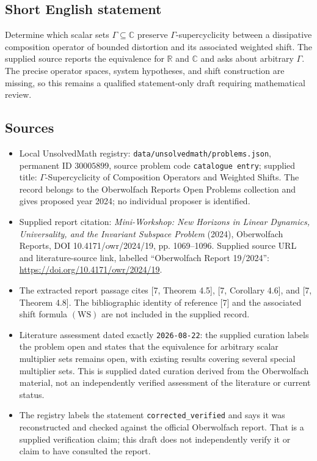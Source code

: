 \documentclass[11pt]{article}
\newcommand{\R}{\mathbb{R}}
\newcommand{\C}{\mathbb{C}}
\begin{document}
\subsection{Short English statement}
Determine which scalar sets \(\Gamma\subseteq\C\) preserve \(\Gamma\)-supercyclicity between a dissipative composition operator of bounded distortion and its associated weighted shift. The supplied source reports the equivalence for \(\R\) and \(\C\) and asks about arbitrary \(\Gamma\). The precise operator spaces, system hypotheses, and shift construction are missing, so this remains a qualified statement-only draft requiring mathematical review.
\subsection{Sources}
\begin{itemize}
\item Local UnsolvedMath registry: \texttt{data/unsolvedmath/problems.json}, permanent ID \(30005899\), source problem code \texttt{catalogue entry}; supplied title: \(\Gamma\)-Supercyclicity of Composition Operators and Weighted Shifts. The record belongs to the Oberwolfach Reports Open Problems collection and gives proposed year 2024; no individual proposer is identified.
\item Supplied report citation: \emph{Mini-Workshop: New Horizons in Linear Dynamics, Universality, and the Invariant Subspace Problem} (2024), Oberwolfach Reports, DOI 10.4171/owr/2024/19, pp. 1069--1096. Supplied source URL and literature-source link, labelled ``Oberwolfach Report 19/2024'': \url{https://doi.org/10.4171/owr/2024/19}.
\item The extracted report passage cites [7, Theorem 4.5], [7, Corollary 4.6], and [7, Theorem 4.8]. The bibliographic identity of reference [7] and the associated shift formula \((\mathrm{WS})\) are not included in the supplied record.
\item Literature assessment dated exactly \texttt{2026-08-22}: the supplied curation labels the problem open and states that the equivalence for arbitrary scalar multiplier sets remains open, with existing results covering several special multiplier sets. This is supplied dated curation derived from the Oberwolfach material, not an independently verified assessment of the literature or current status.
\item The registry labels the statement \texttt{corrected\_verified} and says it was reconstructed and checked against the official Oberwolfach report. That is a supplied verification claim; this draft does not independently verify it or claim to have consulted the report.
\end{itemize}
\end{document}
